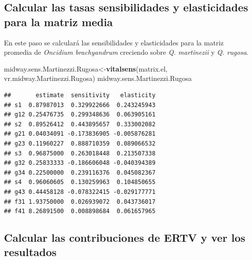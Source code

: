 \documentclass[
]{book}
\newenvironment{Shaded}{\begin{snugshade}}{\end{snugshade}}
\newcommand{\FunctionTok}[1]{\textcolor[rgb]{0.13,0.29,0.53}{\textbf{#1}}}
\newcommand{\NormalTok}[1]{#1}
\newcommand{\OtherTok}[1]{\textcolor[rgb]{0.56,0.35,0.01}{#1}}
\newcommand{\SpecialCharTok}[1]{\textcolor[rgb]{0.81,0.36,0.00}{\textbf{#1}}}
\theoremstyle{definition}
\theoremstyle{definition}
\theoremstyle{definition}
\theoremstyle{definition}
\theoremstyle{remark}
\begin{document}
\subsection{Calcular las tasas sensibilidades y elasticidades para la matriz media}\label{calcular-las-tasas-sensibilidades-y-elasticidades-para-la-matriz-media}

En este paso se calculará las sensibilidades y elasticidades para la matriz promedia de \emph{Oncidium brachyandrum} creciendo sobre \emph{Q. martinezii} y \emph{Q. rugosa}.

\begin{Shaded}
\begin{Highlighting}[]
\NormalTok{midway.sens.Martinezzi.Rugosa}\OtherTok{\textless{}{-}}\FunctionTok{vitalsens}\NormalTok{(matrix.el, vr.midway.Martinezzi.Rugosa) }
\NormalTok{midway.sens.Martinezzi.Rugosa}
\end{Highlighting}
\end{Shaded}

\begin{verbatim}
##       estimate  sensitivity   elasticity
## s1  0.87987013  0.329922666  0.243245943
## g12 0.25476735  0.299348636  0.063905161
## s2  0.89526412  0.443895657  0.333002082
## g21 0.04034091 -0.173836905 -0.005876281
## g23 0.11960227  0.888710359  0.089066532
## s3  0.96875000  0.263018448  0.213507338
## g32 0.25833333 -0.186606048 -0.040394389
## g34 0.22500000  0.239116376  0.045082367
## s4  0.96060605  0.130259963  0.104850655
## g43 0.44458128 -0.078322415 -0.029177771
## f31 1.93750000  0.026939072  0.043736017
## f41 8.26891500  0.008898684  0.061657965
\end{verbatim}

\subsection{Calcular las contribuciones de ERTV y ver los resultados}\label{calcular-las-contribuciones-de-ertv-y-ver-los-resultados}

\begin{Shaded}
\end{Shaded}
\end{document}
